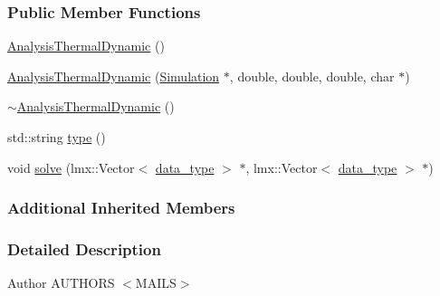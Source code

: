 \subsubsection*{Public Member Functions}
\begin{DoxyCompactItemize}
\item 
\hyperlink{classmknix_1_1_analysis_thermal_dynamic_a475e28b3bb7b7a9d2cf3628863bd8291}{Analysis\-Thermal\-Dynamic} ()
\item 
\hyperlink{classmknix_1_1_analysis_thermal_dynamic_a161ebe1ed696232ed05ef778cdcabcb8}{Analysis\-Thermal\-Dynamic} (\hyperlink{classmknix_1_1_simulation}{Simulation} $\ast$, double, double, double, char $\ast$)
\item 
\hyperlink{classmknix_1_1_analysis_thermal_dynamic_ad0dbaa6affc6e4a285d310e209fe2b73}{$\sim$\-Analysis\-Thermal\-Dynamic} ()
\item 
std\-::string \hyperlink{classmknix_1_1_analysis_thermal_dynamic_ae1d271bfca189706a101259cff192ec9}{type} ()
\item 
void \hyperlink{classmknix_1_1_analysis_thermal_dynamic_aafe2cdc0b12567535eedc9f675c0944d}{solve} (lmx\-::\-Vector$<$ \hyperlink{namespacemknix_a16be4b246fbf2cceb141e3a179111020}{data\-\_\-type} $>$ $\ast$, lmx\-::\-Vector$<$ \hyperlink{namespacemknix_a16be4b246fbf2cceb141e3a179111020}{data\-\_\-type} $>$ $\ast$)
\end{DoxyCompactItemize}
\subsubsection*{Additional Inherited Members}


\subsubsection{Detailed Description}
\begin{DoxyAuthor}{Author}
A\-U\-T\-H\-O\-R\-S $<$\-M\-A\-I\-L\-S$>$ 
\end{DoxyAuthor}


